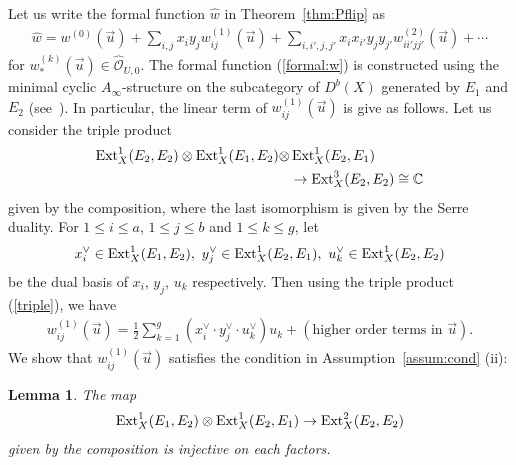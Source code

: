 \documentclass[11pt]{amsart}
\theoremstyle{plain}
\newtheorem{lem}[thm]{Lemma}
\newcommand{\oO}{\mathcal{O}}
\newcommand{\Ext}{\mathop{\rm Ext}\nolimits}
\begin{document}
Let us write the formal function $\widehat{w}$ 
in Theorem~\ref{thm:Pflip} as
\begin{align}\label{formal:w}
\widehat{w} 
=w^{(0)}(\vec{u})+\sum_{i, j}x_i y_j w_{ij}^{(1)}(\vec{u})
+\sum_{i, i', j, j'}x_i x_{i'} y_j y_{j'} w_{i i' j j'}^{(2)}(\vec{u}) +\cdots
\end{align}
for $w_{\ast}^{(k)}(\vec{u}) \in \widehat{\oO}_{U, 0}$. 
The formal function (\ref{formal:w})
is 
constructed using the 
minimal cyclic $A_{\infty}$-structure on 
the subcategory of $D^b(X)$ generated by 
$E_1$ and $E_2$
(see~\cite[Subsection~5.1]{Toddbir}). 
In particular, the linear term of $w_{ij}^{(1)}(\vec{u})$ is 
give as follows. 
Let us consider the triple product 
\begin{align}\notag
\Ext_X^1(E_2, E_2) \otimes \Ext_X^1(E_1, E_2) \otimes
&\Ext_X^1(E_2, E_1) \\
\label{triple}
&\to \Ext_X^3(E_2, E_2) 
\cong \mathbb{C}
\end{align}
given by the composition, 
where the last isomorphism is given by the 
Serre duality. 
For $1\le i\le a$, $1\le j\le b$
and $1\le k \le g$, let 
\begin{align*}
x_i^{\vee} \in \Ext_X^1(E_1, E_2), \ 
y_j^{\vee} \in \Ext_X^1(E_2, E_1), \ 
u_k^{\vee} \in \Ext_X^1(E_2, E_2)
\end{align*}
be the dual basis of 
$x_i$, $y_j$, $u_k$
respectively. 
Then using the triple product (\ref{triple}), 
we have
\begin{align}\label{w:linear}
w_{ij}^{(1)}(\vec{u})=
\frac{1}{2} \sum_{k=1}^g(x_i^{\vee} \cdot y_j^{\vee} \cdot u_k^{\vee}) 
u_k +(\mbox{higher order terms in } \vec{u}). 
\end{align}
We show that 
$w_{ij}^{(1)}(\vec{u})$ satisfies the condition 
in Assumption~\ref{assum:cond} (ii): 
\begin{lem}\label{lem:inj}
The map 
\begin{align}\label{ext:compose}
\Ext_X^1(E_1, E_2) \otimes \Ext_X^1(E_2, E_1) \to \Ext_X^2(E_2, E_2)
\end{align}
given by the composition 
is injective on each factors. 
\end{lem}
\end{document}
